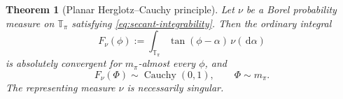 \documentclass[11pt]{article}
\numberwithin{equation}{section}
\theoremstyle{thmstyleone}%
\newtheorem{theorem}{Theorem}[section]
\theoremstyle{thmstyletwo}%
\let\cref\autoref
\newcommand{\dd}{\,\mathrm d}
\newcommand{\Cauchy}{\operatorname{Cauchy}}
\begin{document}
\begin{theorem}[Planar Herglotz--Cauchy principle]
\label{thm:planar-cauchy}
Let \(\nu\) be a Borel probability measure on \(\mathbb T_\pi\) satisfying
\cref{eq:secant-integrability}.  Then the ordinary integral
\begin{equation}
  F_\nu(\phi)
  :=
  \int_{\mathbb T_\pi}\tan(\phi-\alpha)\,\nu(\dd\alpha)
  \label{eq:planar-tangent-transform}
\end{equation}
is absolutely convergent for \(m_\pi\)-almost every \(\phi\), and
\begin{equation}
  F_\nu(\Phi)\sim\Cauchy(0,1),
  \qquad \Phi\sim m_\pi.
  \label{eq:planar-cauchy-law}
\end{equation}
The representing measure \(\nu\) is necessarily singular.
\end{theorem}
\end{document}
